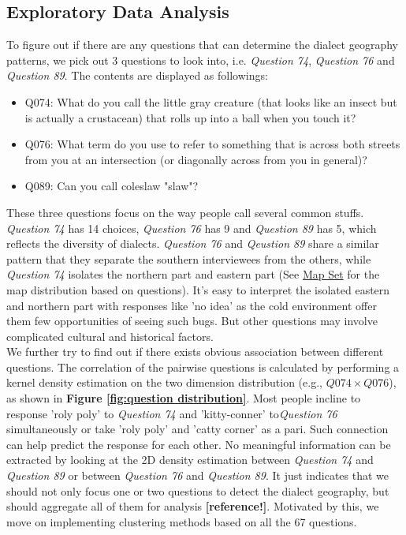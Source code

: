 \subsection{Exploratory Data Analysis}

\qquad To figure out if there are any questions that can determine the dialect geography patterns, we pick out 3 questions to look into, i.e. \textit{Question 74}, \textit{Question 76} and \textit{Question 89}. The contents are displayed as followings: 

\begin{itemize}
\item Q074: What do you call the little gray creature (that looks like an insect but is actually a crustacean) that rolls up into a ball when you touch it?
   
\item Q076:  What term do you use to refer to something that is across both streets from you at an intersection (or diagonally across from you in general)?

\item Q089: Can you call coleslaw "slaw"?
\end{itemize}

\qquad These three questions focus on the way people call several common stuffs. \textit{Question 74} has 14 choices, \textit{Question 76} has 9 and \textit{Question 89} has 5, which reflects the diversity of dialects. \textit{Question 76} and \textit{Qeustion 89} share a similar pattern that they separate the southern interviewees from the others, while \textit{Question 74} isolates the northern part and eastern part (See \href{https://yeyt2718.shinyapps.io/map_Question}{Map Set} for the map distribution based on questions). It's easy to interpret the isolated eastern and northern part with responses like 'no idea' as the cold environment offer them few opportunities of seeing such bugs. But other questions may involve complicated cultural and historical factors.\\




\qquad  We further try to find out if there exists obvious association between different questions. The correlation of the pairwise questions is calculated by performing a kernel density estimation on the two dimension distribution (e.g., $Q074 \times Q076$), as shown in \textbf{Figure \ref{fig:question distribution}}. Most people incline to response 'roly poly' to \textit{Question 74} and 'kitty-conner' to\textit{Question 76} simultaneously or take 'roly poly' and 'catty corner' as a pari. Such connection can help predict the response for each other. No meaningful information can be extracted by looking at the 2D density estimation between \textit{Question 74} and \textit{Question 89} or between \textit{Question 76} and \textit{Question 89}. It just indicates that we should not only focus one or two questions to detect the dialect geography, but should aggregate all of them for analysis \textbf{[reference!]}. Motivated by this, we move on implementing clustering methods based on all the 67 questions.



